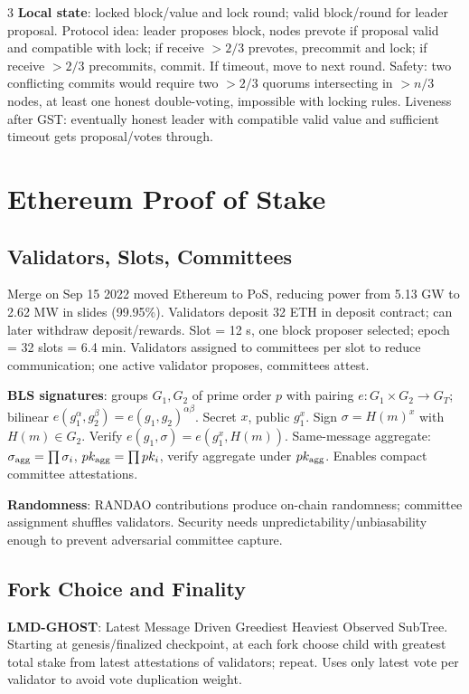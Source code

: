 \documentclass[8pt]{extarticle}
\newcommand{\term}[1]{\textbf{#1}}
\begin{document}
\begin{multicols*}{3}
\term{Local state}: locked block/value and lock round; valid block/round for leader proposal. Protocol idea: leader proposes block, nodes prevote if proposal valid and compatible with lock; if receive $>2/3$ prevotes, precommit and lock; if receive $>2/3$ precommits, commit. If timeout, move to next round. Safety: two conflicting commits would require two $>2/3$ quorums intersecting in $>n/3$ nodes, at least one honest double-voting, impossible with locking rules. Liveness after GST: eventually honest leader with compatible valid value and sufficient timeout gets proposal/votes through.

\section{Ethereum Proof of Stake}
\subsection{Validators, Slots, Committees}
Merge on Sep 15 2022 moved Ethereum to PoS, reducing power from 5.13 GW to 2.62 MW in slides (99.95\%). Validators deposit 32 ETH in deposit contract; can later withdraw deposit/rewards. Slot = 12 s, one block proposer selected; epoch = 32 slots = 6.4 min. Validators assigned to committees per slot to reduce communication; one active validator proposes, committees attest.

\term{BLS signatures}: groups $G_1,G_2$ of prime order $p$ with pairing $e:G_1\times G_2\to G_T$; bilinear $e(g_1^\alpha,g_2^\beta)=e(g_1,g_2)^{\alpha\beta}$. Secret $x$, public $g_1^x$. Sign $\sigma=H(m)^x$ with $H(m)\in G_2$. Verify $e(g_1,\sigma)=e(g_1^x,H(m))$. Same-message aggregate: $\sigma_{\rm agg}=\prod\sigma_i$, $pk_{\rm agg}=\prod pk_i$, verify aggregate under $pk_{\rm agg}$. Enables compact committee attestations.

\term{Randomness}: RANDAO contributions produce on-chain randomness; committee assignment shuffles validators. Security needs unpredictability/unbiasability enough to prevent adversarial committee capture.

\subsection{Fork Choice and Finality}
\term{LMD-GHOST}: Latest Message Driven Greediest Heaviest Observed SubTree. Starting at genesis/finalized checkpoint, at each fork choose child with greatest total stake from latest attestations of validators; repeat. Uses only latest vote per validator to avoid vote duplication weight.


\end{multicols*}
\end{document}
